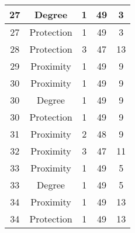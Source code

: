 \documentclass[results.tex]{subfiles}
\begin{document}
\begin{center}
\begin{tabular}{| c || c | c | c | c |}
            \hline
            27                      & Degree                       & 1                      & 49                      & 3                    \\
            \hline
            27                      & Protection                   & 1                      & 49                      & 3                    \\
            \hline
            28                      & Protection                   & 3                      & 47                      & 13                   \\
            \hline
            29                      & Proximity                    & 1                      & 49                      & 9                    \\
            \hline
            30                      & Proximity                    & 1                      & 49                      & 9                    \\
            \hline
            30                      & Degree                       & 1                      & 49                      & 9                    \\
            \hline
            30                      & Protection                   & 1                      & 49                      & 9                    \\
            \hline
            31                      & Proximity                    & 2                      & 48                      & 9                    \\
            \hline
            32                      & Proximity                    & 3                      & 47                      & 11                   \\
            \hline
            33                      & Proximity                    & 1                      & 49                      & 5                    \\
            \hline
            33                      & Degree                       & 1                      & 49                      & 5                    \\
            \hline
            34                      & Proximity                    & 1                      & 49                      & 13                   \\
            \hline
            34                      & Protection                   & 1                      & 49                      & 13                   \\

\end{tabular}
\end{center}
\end{document}
